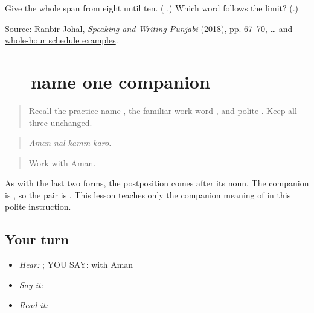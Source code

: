 \begin{tcolorbox}[breakable,colback=teal!4,colframe=teal!35!black,title={Before you move on}]
Give the whole span from eight until ten. (\textbf{     }.) Which word follows the limit? (\textbf{}.)

Source: Ranbir Johal, \emph{Speaking and Writing Punjabi} (2018), pp. 67–70, \href{https://openlibrary-repo.ecampusontario.ca/jspui/bitstream/123456789/492/2/2018Pun1100CoursePackage.pdf}{ …  and whole-hour schedule examples}.
\end{tcolorbox}
\section[\texorpdfstring{\pa{ਅਮਨ} \pa{ਨਾਲ} \pa{ਕੰਮ} \pa{ਕਰੋ} (Aman naal kamm karo)}{ਅਮਨ ਨਾਲ ਕੰਮ ਕਰੋ (Aman naal kamm karo)}]{    — name one companion}

\label{lesson:PA-C178-naal}



\begin{quote}
Recall the practice name \textbf{}, the familiar work word \textbf{}, and polite \textbf{}. Keep all three unchanged.
\end{quote}

\begin{grammarlens}[title={Grammar Lens: \pa{ਨਾਲ} follows the companion noun}]
\begin{quote}
\textbf{   }
\end{quote}

\begin{quote}
\emph{Aman nāl kamm karo.}
\end{quote}

\begin{quote}
Work with Aman.
\end{quote}

As with the last two forms, the postposition comes after its noun. The companion is \textbf{}, so the pair is \textbf{ }. This lesson teaches only the companion meaning of \textbf{} in this polite instruction.
\end{grammarlens}

\subsection*{Your turn}
\begin{itemize}
\raggedright
  \item \emph{Hear:} \textbf{ }; YOU SAY: with Aman
  \item \emph{Say it:} \textbf{   }
  \item \emph{Read it:} \textbf{   }
\end{itemize}

